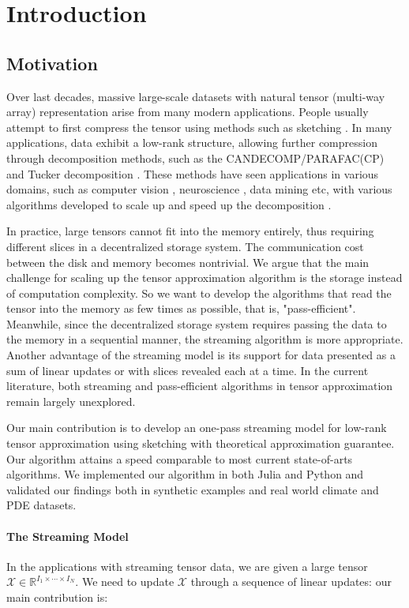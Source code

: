 \section{Introduction}
\subsection{Motivation}

Over last decades, massive large-scale datasets with natural tensor (multi-way array) representation arise from many modern applications. People usually attempt to first compress the tensor using methods such as sketching \cite{halko2011finding}. In many applications, data exhibit a low-rank structure, allowing further compression through decomposition methods, such as the CANDECOMP/PARAFAC(CP) and Tucker decomposition \cite{kolda2009tensor}. These methods have seen applications in various domains, such as computer vision \cite{vasilescu2002multilinear}, neuroscience \cite{cichocki2013tensor}, data mining \cite{kolda2008scalable} etc, with various algorithms developed to scale up and speed up the decomposition \cite{anandkumar2014tensor,choi2014dfacto,phan2013fast}. 

In practice, large tensors cannot fit into the memory entirely, thus requiring different slices in a decentralized storage system. The communication cost between the disk and memory becomes nontrivial. We argue that the main challenge for scaling up the tensor approximation algorithm is the storage instead of computation complexity. So we want to develop the algorithms that read the tensor into the memory as few times as possible, that is, "pass-efficient". Meanwhile, since the decentralized storage system requires passing the data to the memory in a sequential manner, the streaming algorithm is more appropriate. Another advantage of the streaming model is its support for data presented as a sum of linear updates or with slices revealed each at a time. In the current literature, both streaming and pass-efficient algorithms in tensor approximation remain largely unexplored.

Our main contribution is to develop an one-pass streaming model for low-rank tensor approximation using sketching with theoretical approximation guarantee. Our algorithm attains a speed comparable to most current state-of-arts algorithms. We implemented our algorithm in both Julia and Python and validated our findings both in synthetic examples and real world climate and PDE datasets. 
 
\paragraph{The Streaming Model} In the applications with streaming tensor data, we are given a large tensor $\mathscr{X} \in \mathbb{R}^{I_1 \times \cdots \times I_N}$. We need to update $\mathscr{X}$ through a sequence of linear updates: 
our main contribution is: 

